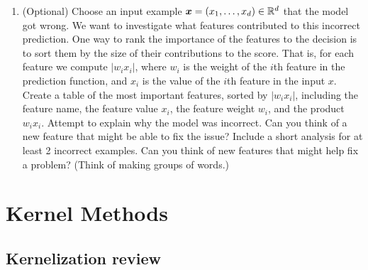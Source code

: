 \documentclass{article}
\theoremstyle{plain}
\theoremstyle{definition}
\begin{document}
\begin{enumerate}
  \setcounter{enumi}{\value{saveenum}}
\item \textcolor{nyupurple}{(Optional)} Choose an input example $\boldsymbol{x}=\left(x_{1},\ldots,x_{d}\right)\in\mathbb{R}^{d}$
that the model got wrong. We want to investigate what features contributed
to this incorrect prediction. One way to rank the importance of the
features to the decision is to sort them by the size of their contributions
to the score. That is, for each feature we compute $\left|w_{i}x_{i}\right|$,
where $w_{i}$ is the weight of the $i$th feature in the prediction
function, and $x_{i}$ is the value of the $i$th feature in the input
$x$. Create a table of the most important features, sorted by $\left|w_{i}x_{i}\right|$,
including the feature name, the feature value $x_{i}$, the feature
weight $w_{i}$, and the product $w_{i}x_{i}$. Attempt to explain
why the model was incorrect. Can you think of a new feature that might
be able to fix the issue? Include a short analysis for at least 2
incorrect examples.
Can you think of new features that might help fix a problem? (Think of making groups of words.)
\setcounter{saveenum}{\value{enumi}}
\end{enumerate}


\section{\large Kernel Methods}

\subsection{Kernelization review}
\end{document}
